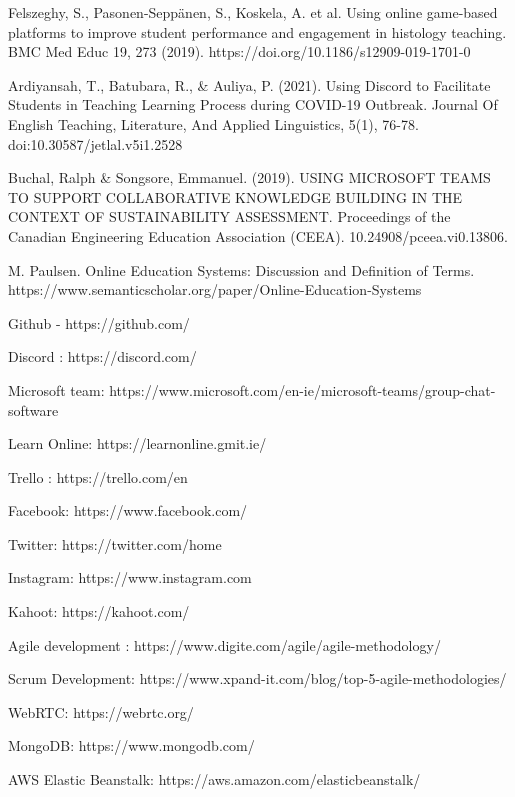 \begin{thebibliography}{00}

 Felszeghy, S., Pasonen-Seppänen, S., Koskela, A. et al. Using online game-based platforms to improve student performance and engagement in histology teaching. BMC Med Educ 19, 273 (2019). https://doi.org/10.1186/s12909-019-1701-0

 Ardiyansah, T., Batubara, R., & Auliya, P. (2021). Using Discord to Facilitate Students in Teaching Learning Process during COVID-19 Outbreak. Journal Of English Teaching, Literature, And Applied Linguistics, 5(1), 76-78. doi:10.30587/jetlal.v5i1.2528

 Buchal, Ralph & Songsore, Emmanuel. (2019). USING MICROSOFT TEAMS TO SUPPORT COLLABORATIVE KNOWLEDGE BUILDING IN THE CONTEXT OF SUSTAINABILITY ASSESSMENT. Proceedings of the Canadian Engineering Education Association (CEEA). 10.24908/pceea.vi0.13806.

 M. Paulsen. Online Education Systems: Discussion and Definition of Terms. https://www.semanticscholar.org/paper/Online-Education-Systems%

 Github - https://github.com/  

 Discord : https://discord.com/

 Microsoft team: https://www.microsoft.com/en-ie/microsoft-teams/group-chat-software

 Learn Online: https://learnonline.gmit.ie/ 

  Trello : https://trello.com/en

 Facebook: https://www.facebook.com/

 Twitter: https://twitter.com/home

 Instagram: https://www.instagram.com

 Kahoot: https://kahoot.com/

 Agile development : https://www.digite.com/agile/agile-methodology/

 Scrum Development: https://www.xpand-it.com/blog/top-5-agile-methodologies/

 WebRTC: https://webrtc.org/

 MongoDB: https://www.mongodb.com/

 AWS Elastic Beanstalk: https://aws.amazon.com/elasticbeanstalk/


\end{thebibliography}
